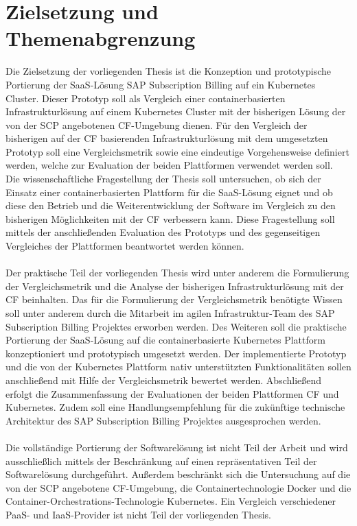 \newpage
\section{Zielsetzung und Themenabgrenzung}
\label{Themenabgrenzung}
Die Zielsetzung der vorliegenden Thesis ist die Konzeption und prototypische Portierung der \ac{SaaS}-Lösung SAP Subscription Billing auf ein Kubernetes Cluster. Dieser Prototyp soll als Vergleich einer containerbasierten Infrastrukturlösung auf einem Kubernetes Cluster mit der bisherigen Lösung der von der \ac{SCP} angebotenen \ac{CF}-Umgebung dienen. Für den Vergleich der bisherigen auf der \ac{CF} basierenden Infrastrukturlösung mit dem umgesetzten Prototyp soll eine Vergleichsmetrik sowie eine eindeutige Vorgehensweise definiert werden, welche zur Evaluation der beiden Plattformen verwendet werden soll.\\
Die wissenschaftliche Fragestellung der Thesis soll untersuchen, ob sich der Einsatz einer containerbasierten Plattform für die \ac{SaaS}-Lösung eignet und ob diese den Betrieb und die Weiterentwicklung der Software im Vergleich zu den bisherigen Möglichkeiten mit der \ac{CF} verbessern kann. Diese Fragestellung soll mittels der anschließenden Evaluation des Prototyps und des gegenseitigen Vergleiches der Plattformen beantwortet werden können.\\
\\
Der praktische Teil der vorliegenden Thesis wird unter anderem die Formulierung der Vergleichsmetrik und die Analyse der bisherigen Infrastrukturlösung mit der \ac{CF} beinhalten. Das für die Formulierung der Vergleichsmetrik benötigte Wissen soll unter anderem durch die Mitarbeit im agilen Infrastruktur-Team des SAP Subscription Billing Projektes erworben werden. Des Weiteren soll die praktische Portierung der \ac{SaaS}-Lösung auf die containerbasierte Kubernetes Plattform konzeptioniert und prototypisch umgesetzt werden. Der implementierte Prototyp und die von der Kubernetes Plattform nativ unterstützten Funktionalitäten sollen anschließend mit Hilfe der Vergleichsmetrik bewertet werden. Abschließend erfolgt die Zusammenfassung der Evaluationen der beiden Plattformen \ac{CF} und Kubernetes. Zudem soll eine Handlungsempfehlung für die zukünftige technische Architektur des SAP Subscription Billing Projektes ausgesprochen werden.\\
\\
Die vollständige Portierung der Softwarelösung ist nicht Teil der Arbeit und wird ausschließlich mittels der Beschränkung auf einen repräsentativen Teil der Softwarelösung durchgeführt. Außerdem beschränkt sich die Untersuchung auf die von der \ac{SCP} angebotene \ac{CF}-Umgebung, die Containertechnologie Docker und die Container-Orchestrations-Technologie Kubernetes. Ein Vergleich verschiedener \ac{PaaS}- und \ac{IaaS}-Provider ist nicht Teil der vorliegenden Thesis.\\
